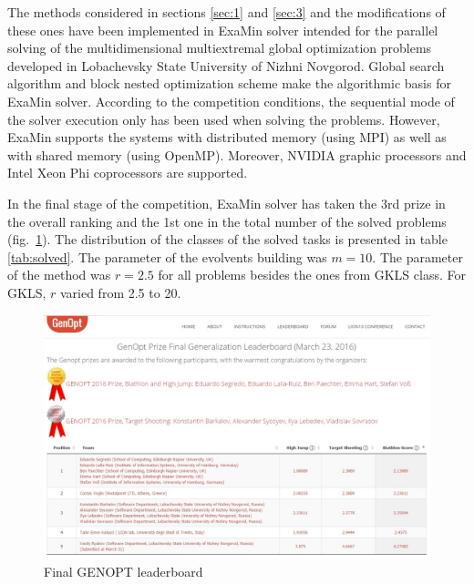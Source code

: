 \documentclass{llncs}
\begin{document}
The methods considered in sections \ref{sec:1} and \ref{sec:3} and the modifications of these ones have been implemented in ExaMin solver intended for the parallel solving of the multidimensional multiextremal global optimization problems developed in Lobachevsky State University of Nizhni Novgorod. Global search algorithm and block nested optimization scheme \cite{Barkalov2014} make the algorithmic basis for ExaMin solver. According to the competition conditions, the sequential mode of the solver execution only has been used when solving the problems. However, ExaMin supports the systems with distributed memory (using MPI) as well as with shared memory (using OpenMP). Moreover, NVIDIA graphic processors and Intel Xeon Phi coprocessors are supported.

In the final stage of the competition, ExaMin solver has taken the 3rd prize in the overall ranking and the 1st one in the total number of the solved problems (fig.~\ref{fig:4}). The distribution of the classes of the solved tasks is presented in table \ref{tab:solved}. The parameter of the evolvents building was $m=10$. The parameter of the method was $r=2.5$ for all problems besides the ones from GKLS class. For GKLS, $r$ varied from 2.5 to 20.

\begin{figure}
	\center
  \includegraphics[width=1.00\textwidth]{fig4.jpg} 
  \caption{Final GENOPT leaderboard}
  \label{fig:4}       %
\end{figure} 
\end{document}
